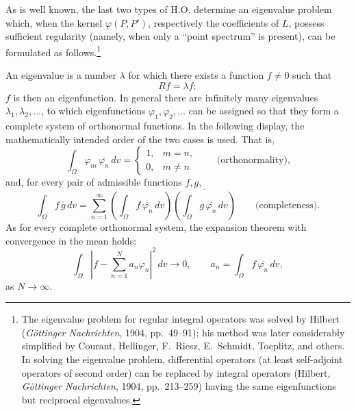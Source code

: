 ﻿\documentclass[paper=b5,fontsize=13pt,bookmarkpackage=false,twoside]{scrartcl}
\newcounter{translatornote}
\begin{document}
As is well known, the last two types of H.O. determine an eigenvalue problem which, when the kernel $\varphi(P,P')$, respectively the coefficients of $L$, possess sufficient regularity (namely, when only a ``point spectrum'' is present), can be formulated as follows.\footnote{\label{fn:source-3}The eigenvalue problem for regular integral operators was solved by Hilbert (\emph{Göttinger Nachrichten}, 1904, pp.~49--91); his method was later considerably simplified by Courant, Hellinger, F.~Riesz, E.~Schmidt, Toeplitz, and others. In solving the eigenvalue problem, differential operators (at least self-adjoint operators of second order) can be replaced by integral operators (Hilbert, \emph{Göttinger Nachrichten}, 1904, pp.~213--259) having the same eigenfunctions but reciprocal eigenvalues.}

An eigenvalue is a number $\lambda$ for which there exists a function $f\ne0$ such that
\[
 Rf=\lambda f;
\]
$f$ is then an eigenfunction. In general there are infinitely many eigenvalues $\lambda_1,\lambda_2,\ldots$, to which eigenfunctions $\varphi_1,\varphi_2,\ldots$ can be assigned so that they form a complete system of orthonormal functions. In the following display, the mathematically intended order of the two cases is used. That is,
\[
 \int_\Omega \varphi_m\,\overline{\varphi_n}\,dv
 =
 \begin{cases}
 1,&m=n,\\
 0,&m\ne n
 \end{cases}
 \qquad\text{(orthonormality),}
\]
and, for every pair of admissible functions $f,g$,
\[
 \int_\Omega f\,\overline g\,dv
 =
 \sum_{n=1}^{\infty}
 \left(\int_\Omega f\,\overline{\varphi_n}\,dv\right)
 \overline{\left(\int_\Omega g\,\overline{\varphi_n}\,dv\right)}
 \qquad\text{(completeness).}
\]
As for every complete orthonormal system, the expansion theorem with convergence in the mean holds:
\[
 \int_\Omega
 \left|f-\sum_{n=1}^{N}a_n\varphi_n\right|^2\,dv\longrightarrow0,
 \qquad
 a_n=\int_\Omega f\,\overline{\varphi_n}\,dv,
\]
as $N\to\infty$.
\end{document}
